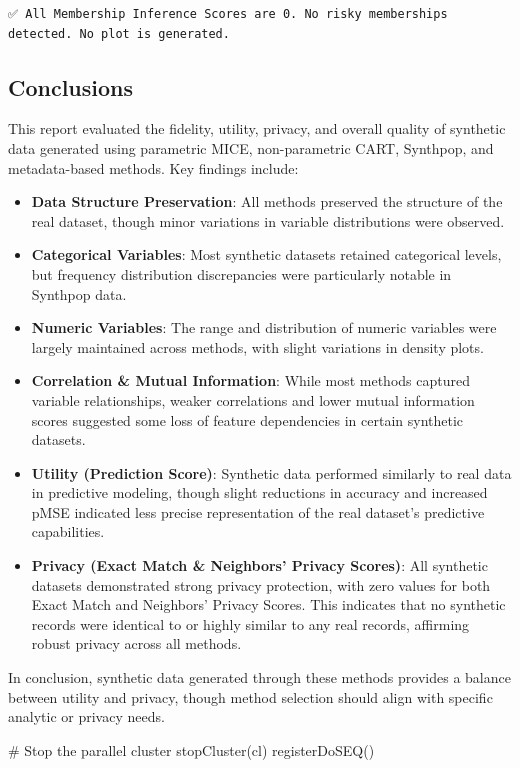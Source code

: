 \documentclass[
  letterpaper,
  DIV=11,
  numbers=noendperiod]{scrartcl}
\newenvironment{Shaded}{\begin{snugshade}}{\end{snugshade}}
\newcommand{\CommentTok}[1]{\textcolor[rgb]{0.37,0.37,0.37}{#1}}
\newcommand{\FunctionTok}[1]{\textcolor[rgb]{0.28,0.35,0.67}{#1}}
\newcommand{\NormalTok}[1]{\textcolor[rgb]{0.00,0.23,0.31}{#1}}
\providecommand{\tightlist}{%
  \setlength{\itemsep}{0pt}\setlength{\parskip}{0pt}}\usepackage{longtable,booktabs,array}
\begin{document}
\begin{verbatim}
✅ All Membership Inference Scores are 0. No risky memberships detected. No plot is generated. 
\end{verbatim}

\subsection{Conclusions}\label{conclusions}

This report evaluated the fidelity, utility, privacy, and overall
quality of synthetic data generated using parametric MICE,
non-parametric CART, Synthpop, and metadata-based methods. Key findings
include:

\begin{itemize}
\tightlist
\item
  \textbf{Data Structure Preservation}: All methods preserved the
  structure of the real dataset, though minor variations in variable
  distributions were observed.
\item
  \textbf{Categorical Variables}: Most synthetic datasets retained
  categorical levels, but frequency distribution discrepancies were
  particularly notable in Synthpop data.
\item
  \textbf{Numeric Variables}: The range and distribution of numeric
  variables were largely maintained across methods, with slight
  variations in density plots.
\item
  \textbf{Correlation \& Mutual Information}: While most methods
  captured variable relationships, weaker correlations and lower mutual
  information scores suggested some loss of feature dependencies in
  certain synthetic datasets.
\item
  \textbf{Utility (Prediction Score)}: Synthetic data performed
  similarly to real data in predictive modeling, though slight
  reductions in accuracy and increased pMSE indicated less precise
  representation of the real dataset's predictive capabilities.
\item
  \textbf{Privacy (Exact Match \& Neighbors' Privacy Scores)}: All
  synthetic datasets demonstrated strong privacy protection, with zero
  values for both Exact Match and Neighbors' Privacy Scores. This
  indicates that no synthetic records were identical to or highly
  similar to any real records, affirming robust privacy across all
  methods.
\end{itemize}

In conclusion, synthetic data generated through these methods provides a
balance between utility and privacy, though method selection should
align with specific analytic or privacy needs.

\begin{Shaded}
\begin{Highlighting}[]
\CommentTok{\# Stop the parallel cluster}
\FunctionTok{stopCluster}\NormalTok{(cl)}
\FunctionTok{registerDoSEQ}\NormalTok{()}
\end{Highlighting}
\end{Shaded}
\end{document}
